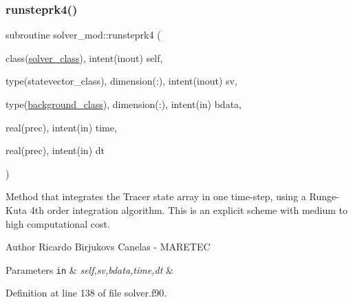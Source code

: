 \subsubsection{\texorpdfstring{runsteprk4()}{runsteprk4()}}
{\footnotesize\ttfamily subroutine solver\+\_\+mod\+::runsteprk4 (\begin{DoxyParamCaption}\item[{class(\mbox{\hyperlink{structsolver__mod_1_1solver__class}{solver\+\_\+class}}), intent(inout)}]{self,  }\item[{type(statevector\+\_\+class), dimension(\+:), intent(inout)}]{sv,  }\item[{type(\mbox{\hyperlink{structbackground__mod_1_1background__class}{background\+\_\+class}}), dimension(\+:), intent(in)}]{bdata,  }\item[{real(prec), intent(in)}]{time,  }\item[{real(prec), intent(in)}]{dt }\end{DoxyParamCaption})\hspace{0.3cm}{\ttfamily [private]}}



Method that integrates the Tracer state array in one time-\/step, using a Runge-\/\+Kuta 4th order integration algorithm. This is an explicit scheme with medium to high computational cost. 

\begin{DoxyAuthor}{Author}
Ricardo Birjukovs Canelas -\/ M\+A\+R\+E\+T\+EC 
\end{DoxyAuthor}

\begin{DoxyParams}[1]{Parameters}
\mbox{\tt in}  & {\em self,sv,bdata,time,dt} & \\
\hline
\end{DoxyParams}


Definition at line 138 of file solver.\+f90.


